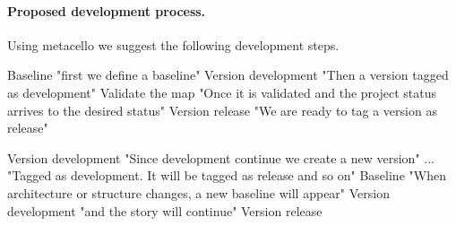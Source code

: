 \documentclass[a4paper,10pt,twoside]{book}
\begin{document}
\paragraph{Proposed development process.}
Using metacello we suggest the following development steps.


\begin{code}{}
Baseline						"first we define a baseline"
Version development			"Then a version tagged as development"
Validate the map				"Once it is validated and the project status arrives to the desired status"
Version release				"We are ready to tag a version as release"	

Version development			"Since development continue we create a new version"
...							"Tagged as development. It will be tagged as release and so on"
Baseline 					"When architecture or structure changes, a new baseline will appear"
Version development			"and the story will continue"
Version release

\end{code}

\ifx\wholebook\relax\else
    
    
\end{document}
